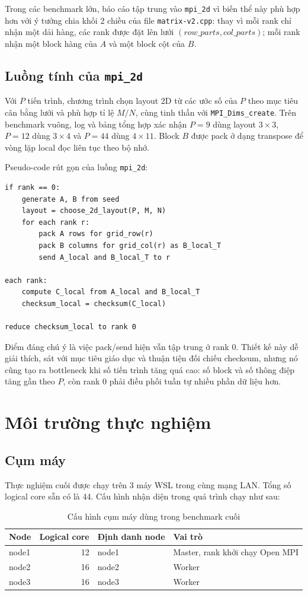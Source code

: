 \documentclass[12pt,a4paper]{article}
\newcommand{\code}[1]{\texttt{#1}}
\begin{document}
Trong các benchmark lớn, báo cáo tập trung vào \code{mpi\_2d} vì biến thể này phù hợp hơn với ý tưởng chia khối 2 chiều của file \code{matrix-v2.cpp}: thay vì mỗi rank chỉ nhận một dải hàng, các rank được đặt lên lưới $(row\_parts, col\_parts)$; mỗi rank nhận một block hàng của $A$ và một block cột của $B$.

\subsection{Luồng tính của \code{mpi\_2d}}
Với $P$ tiến trình, chương trình chọn layout 2D từ các ước số của $P$ theo mục tiêu cân bằng lưới và phù hợp tỉ lệ $M/N$, cùng tinh thần với \code{MPI\_Dims\_create}. Trên benchmark vuông, log và bảng tổng hợp xác nhận $P=9$ dùng layout $3 \times 3$, $P=12$ dùng $3 \times 4$ và $P=44$ dùng $4 \times 11$. Block $B$ được pack ở dạng transpose để vòng lặp local đọc liên tục theo bộ nhớ.

Pseudo-code rút gọn của luồng \code{mpi\_2d}:
\begin{lstlisting}
if rank == 0:
    generate A, B from seed
    layout = choose_2d_layout(P, M, N)
    for each rank r:
        pack A rows for grid_row(r)
        pack B columns for grid_col(r) as B_local_T
        send A_local and B_local_T to r

each rank:
    compute C_local from A_local and B_local_T
    checksum_local = checksum(C_local)

reduce checksum_local to rank 0
\end{lstlisting}

Điểm đáng chú ý là việc pack/send hiện vẫn tập trung ở rank 0. Thiết kế này dễ giải thích, sát với mục tiêu giáo dục và thuận tiện đối chiếu checksum, nhưng nó cũng tạo ra bottleneck khi số tiến trình tăng quá cao: số block và số thông điệp tăng gần theo $P$, còn rank 0 phải điều phối tuần tự nhiều phần dữ liệu hơn.

\section{Môi trường thực nghiệm}
\subsection{Cụm máy}
Thực nghiệm cuối được chạy trên 3 máy WSL trong cùng mạng LAN. Tổng số logical core sẵn có là 44. Cấu hình nhận diện trong quá trình chạy như sau:
\begin{table}[H]
\centering
\caption{Cấu hình cụm máy dùng trong benchmark cuối}
\begin{tabularx}{\textwidth}{lrlX}
\toprule
Node & Logical core & Định danh node & Vai trò \\
\midrule
node1 & 12 & node1 & Master, rank khởi chạy Open MPI \\
node2 & 16 & node2 & Worker \\
node3 & 16 & node3 & Worker \\
\bottomrule
\end{tabularx}
\end{table}
\end{document}

